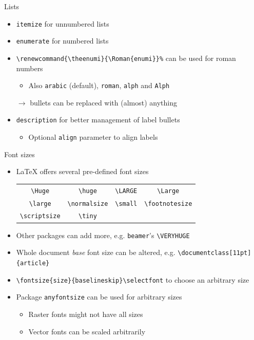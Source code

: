 \documentclass[english]{beamer}
\let\olditem\item
\renewcommand{\item}{\setlength{\itemsep}{\fill}\olditem}
\newenvironment{sitemize}{\let\item\olditem \begin{itemize}}{\vfill\end{itemize}}
\let\textttt\texttt
\renewcommand{\texttt}[1]{\colorbox{gray!10}{\textttt{#1}}}
\begin{document}
\begin{frame}[fragile]{Lists}
    \begin{itemize}
        \item \texttt{itemize} for unnumbered lists
        \item \texttt{enumerate} for numbered lists
        \item \verb|\renewcommand{\theenumi}{\Roman{enumi}}%| can be used for roman numbers
        \begin{sitemize}
            \item Also \texttt{arabic} (default), \texttt{roman}, \texttt{alph} and \texttt{Alph}
        \end{sitemize} 
        \item[$\rightarrow$] bullets can be replaced with (almost) anything 
        \item \texttt{description} for better management of label bullets
        \begin{sitemize}
            \item Optional \texttt{align} parameter to align labels
        \end{sitemize}
    \end{itemize}
\end{frame}

\begin{frame}[fragile]{Font sizes}
    \begin{itemize}
        \item \LaTeX{} offers several pre-defined font sizes
        \begin{center}
            \begin{tabular}{cccc}
                 \verb|\Huge| & \verb|\huge| & \verb|\LARGE| & \verb|\Large| \\
                 \verb|\large| & \verb|\normalsize| & \verb|\small| & \verb|\footnotesize|  \\
                 \verb|\scriptsize| & \verb|\tiny| & & 
            \end{tabular}
        \end{center}

        \item Other packages can add more, e.g. \texttt{beamer}'s \verb|\VERYHUGE|
        \item Whole document \textit{base} font size can be altered, e.g. \verb|\documentclass[11pt]{article}|
        \item \verb|\fontsize{size}{baselineskip}\selectfont| to choose an arbitrary size
        \item Package \texttt{anyfontsize} can be used for arbitrary sizes
        \begin{sitemize}
            \item Raster fonts might not have all sizes
            \item Vector fonts can be scaled arbitrarily
        \end{sitemize}
    \end{itemize}
\end{frame}
\end{document}

